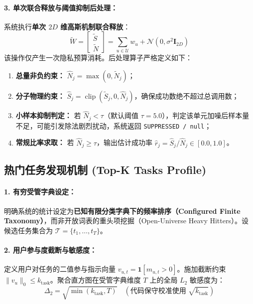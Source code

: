\paragraph{3. 单次联合释放与阈值抑制后处理：}
系统执行\textbf{单次 $2D$ 维高斯机制联合释放}：
\begin{equation}
  \tilde{W} = \begin{bmatrix} \tilde{S} \\ \tilde{N} \end{bmatrix} = \sum_{u \in \mathcal{U}} w_u + \mathcal{N}\left(0, \sigma^2 \mathbf{I}_{2D}\right)
\end{equation}
该操作仅产生一次隐私预算消耗。后处理算子严格定义如下：
\begin{enumerate}[label=\textbf{步骤\arabic*：}, leftmargin=4.5em]
  \item \textbf{总量非负约束：} $\hat{N}_j = \max(0, \tilde{N}_j)$；
  \item \textbf{分子物理约束：} $\hat{S}_j = \operatorname{clip}(\tilde{S}_j, 0, \hat{N}_j)$，确保成功数绝不超过总调用数；
  \item \textbf{小样本抑制判定：} 若 $\hat{N}_j < \tau$（默认阈值 $\tau = 5.0$），判定该单元加噪后样本量不足，可能引发除法剧烈扰动，系统返回 \texttt{SUPPRESSED / null}；
  \item \textbf{常规比率求取：} 若 $\hat{N}_j \ge \tau$，输出估计成功率 $\hat{r}_j = \hat{S}_j / \hat{N}_j \in [0.0, 1.0]$。
\end{enumerate}

\subsection{热门任务发现机制 (Top-K Tasks Profile)}
\paragraph{1. 有穷受管字典设定：}
明确系统的统计设定为\textbf{已知有限分类字典下的频率排序（Configured Finite Taxonomy）}，而非开放词表的重头项挖掘（Open-Universe Heavy Hitters）。设候选任务集合为 $\mathcal{T} = \{t_1, \dots, t_T\}$。

\paragraph{2. 用户参与度截断与敏感度：}
定义用户对任务的二值参与指示向量 $v_{u, t} = \mathbf{1}[m_{u, t} > 0]$。施加截断约束 $\|v_u\|_0 \le k_{\text{task}}$。聚合直方图在受管字典维度 $T$ 上的全局 $L_2$ 敏感度为：
\begin{equation}
  \Delta_2 = \sqrt{\min(k_{\text{task}}, T)} \quad (\text{代码保守校准使用 } \sqrt{k_{\text{task}}})
\end{equation}

